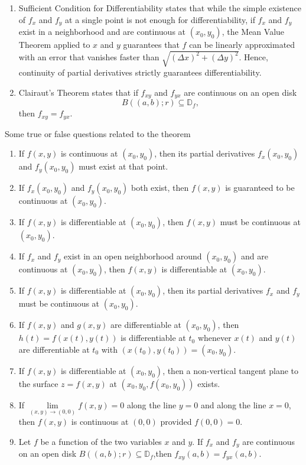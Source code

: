 \documentclass{article}
\begin{document}
\begin{enumerate}[label={\bfseries Theorem}, wide = 0pt]
\begin{enumerate}
    \item Sufficient Condition for Differentiability states that while the simple existence of $f_x$ and $f_y$ at a single point is not enough for differentiability, if $f_x$ and $f_y$ exist in a neighborhood and are continuous at $(x_0,y_0)$, the Mean Value Theorem applied to $x$ and $y$ guarantees that $f$ can be linearly approximated with an error that vanishes faster than $\sqrt{(\Delta x)^2 + (\Delta y)^2}$. Hence, continuity of partial derivatives strictly guarantees differentiability.
    \item Clairaut's Theorem states that if $f_{xy}$ and $f_{yx}$ are continuous on an open disk 
\[
B((a,b);r) \subseteq \mathbb{D}_f,
\] 
then $f_{xy} = f_{yx}$.
\end{enumerate}




Some true or false questions related to the theorem
\begin{enumerate} [1.]
    \item If $f(x,y)$ is continuous at $(x_0,y_0)$, then its partial derivatives $f_x(x_0,y_0)$ and $f_y(x_0,y_0)$ must exist at that point.
    \item If $f_x(x_0,y_0)$ and $f_y(x_0,y_0)$ both exist, then $f(x,y)$ is guaranteed to be continuous at $(x_0,y_0)$.
    \item If $f(x,y)$ is differentiable at $(x_0,y_0)$, then $f(x,y)$ must be continuous at $(x_0,y_0)$.
    \item If $f_x$ and $f_y$ exist in an open neighborhood around $(x_0,y_0)$ and are continuous at $(x_0,y_0)$, then $f(x,y)$ is differentiable at $(x_0,y_0)$.
    \item If $f(x,y)$ is differentiable at $(x_0,y_0)$, then its partial derivatives $f_x$ and $f_y$ must be continuous at $(x_0,y_0)$.
    \item If $f(x,y)$ and $g(x,y)$ are differentiable at $(x_0,y_0)$, then $h(t) = f(x(t), y(t))$ is differentiable at $t_0$ whenever $x(t)$ and $y(t)$ are differentiable at $t_0$ with $(x(t_0), y(t_0)) = (x_0, y_0)$.
    \item If $f(x,y)$ is differentiable at $(x_0,y_0)$, then a non-vertical tangent plane to the surface $z = f(x,y)$ at $(x_0,y_0,f(x_0,y_0))$ exists.
    \item If $\lim \limits_{(x,y) \to (0,0)} f(x,y) = 0$ along the line $y = 0$ and along the line $x = 0$, then $f(x,y)$ is continuous at $(0,0)$ provided $f(0,0) = 0$.
    \item Let $f$ be a function of the two variables $x$ and $y$. If $f_x$ and $f_y$ are continuous on an open disk $B((a,b);r) \subseteq \mathbb{D}_f$,then $f_{xy}(a,b) = f_{yx}(a,b)$. 
\end{enumerate}




\end{enumerate}
\end{document}

